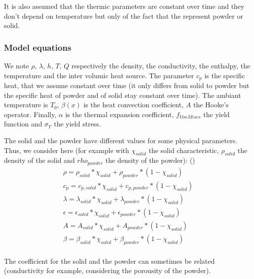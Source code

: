 \documentclass[11pt,a4paper]{article}
\begin{document}
It is also assumed that the thermic parameters are constant over time and they don't depend on temperature but only of the fact that the represent powder or solid.

\subsubsection*{Model equations}

We note $\rho,\,\lambda,\,h,\,T,\,Q$ respectively the density, the conductivity, the enthalpy, the temperature and the inter volumic heat source. The parameter $c_p$ is the specific heat, that we assume constant over time (it only differs from solid to powder but the specific heat of powder and of solid stay constant over time). The ambiant temperature is $T_0$, $\beta(x)$ is the heat convection coefficient, $A$ the Hooke's operator. Finally, $\alpha$ is the thermal expansion coefficient, $f_{VonMises}$ the yield function and $\sigma_Y$ the yield stress.

\vspace{1cm}

The solid and the powder have different values for some physical parameters.
Thus, we consider here (for example with $\chi_{solid}$ the solid characteristic, $\rho_{solid}$ the density of the solid and $rho_{powder}$ the density of the powder):  (\cite{LiParametricanalysisthermal2014,Robertsthreedimensionalfiniteelement2009,AllaireTakingaccountthermal2017})
\begin{equation}
\begin{aligned}
\rho=\rho_{solid}*\chi_{solid}+\rho_{powder}*(1-\chi_{solid}) \\
c_p=c_{p,solid}*\chi_{solid}+c_{p,powder}*(1-\chi_{solid}) \\
\lambda=\lambda_{solid}*\chi_{solid}+\lambda_{powder}*(1-\chi_{solid}) \\
\epsilon=\epsilon_{solid}*\chi_{solid}+\epsilon_{powder}*(1-\chi_{solid}) \\
A=A_{solid}*\chi_{solid}+A_{powder}*(1-\chi_{solid}) \\
\beta=\beta_{solid}*\chi_{solid}+\beta_{powder}*(1-\chi_{solid}) \\
\end{aligned}
\end{equation}

The coefficient for the solid and the powder can sometimes be related (conductivity for example, considering the porousity of the powder).
\end{document}
